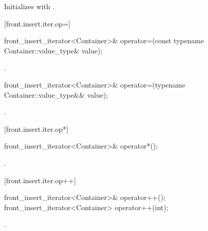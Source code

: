 \begin{itemdescr}
\pnum
\effects
Initializes
with .
\end{itemdescr}

[front.insert.iter.op=]{}

%
\begin{itemdecl}
front_insert_iterator<Container>&
  operator=(const typename Container::value_type& value);
\end{itemdecl}

\begin{itemdescr}
\pnum
\effects
{}

\pnum
\returns
{}.
\end{itemdescr}

%
\begin{itemdecl}
front_insert_iterator<Container>&
  operator=(typename Container::value_type&& value);
\end{itemdecl}

\begin{itemdescr}
\pnum
\effects
{}

\pnum
\returns
{}.
\end{itemdescr}

[front.insert.iter.op*]{}

%
\begin{itemdecl}
front_insert_iterator<Container>& operator*();
\end{itemdecl}

\begin{itemdescr}
\pnum
\returns
{}.
\end{itemdescr}

[front.insert.iter.op++]{}

%
\begin{itemdecl}
front_insert_iterator<Container>& operator++();
front_insert_iterator<Container>  operator++(int);
\end{itemdecl}

\begin{itemdescr}
\pnum
\returns
{}.
\end{itemdescr}

